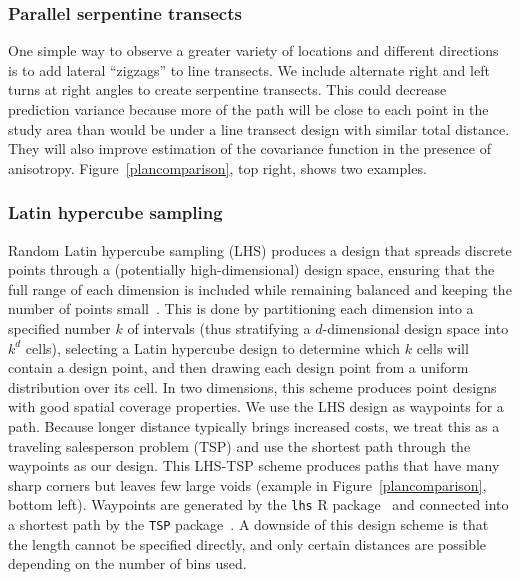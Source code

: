 \documentclass[review]{elsarticle}
\begin{document}
\subsubsection{Parallel serpentine transects}

One simple way to observe a greater variety of locations and different
directions is to add lateral ``zigzags'' to line transects. We include
alternate right and left turns at right angles to create serpentine transects.
This could decrease prediction variance because more of the path will be close
to each point in the study area than would be under a line transect design with
similar total distance. They will also improve estimation of the covariance
function in the presence of anisotropy. Figure~\ref{plancomparison}, top right,
shows two examples.



\subsubsection{Latin hypercube sampling}

Random Latin hypercube sampling (LHS) produces a design that spreads discrete
points through a (potentially high-dimensional) design space, ensuring that
the full range of each dimension is included while remaining balanced and
keeping the number of points small~\citep{mckayetal}. This is done by
partitioning each dimension into a specified number \(k\) of intervals (thus
stratifying a \(d\)-dimensional design space into \(k^{d}\) cells), selecting
a Latin hypercube design to determine which \(k\) cells will contain a design
point, and then drawing each design point from a uniform distribution over its
cell. In two dimensions, this scheme produces point designs with good spatial
coverage properties. We use the LHS design as waypoints for a path. Because
longer distance typically brings increased costs, we treat this as a traveling
salesperson problem (TSP) and use the shortest path through the waypoints as
our design. This LHS-TSP scheme produces paths that have many sharp corners but
leaves few large voids (example in Figure~\ref{plancomparison}, bottom left).
Waypoints are generated by the \texttt{lhs} R package~\citep{lhs} and connected
into a shortest path by the \texttt{TSP} package~\citep{tsp}. A downside of
this design scheme is that the length cannot be specified directly, and only
certain distances are possible depending on the number of bins used.
\end{document}
